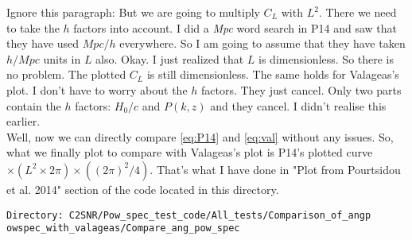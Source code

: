 \documentclass[12pt,a4paper]{article}
\begin{document}
Ignore this paragraph:  But we are going to multiply $ C_L $ with $ L^2 $. There we need to take the $ h $ factors into account.	I did a \textit{Mpc} word search in P14 and saw that they have used $ Mpc/h $ everywhere. So I am going to assume that they have taken $ h/Mpc $ units in $ L $ also.  Okay. I just realized that $ L $ is dimensionless. So there is no problem. The plotted $ C_L $ is still dimensionless. The same holds for Valageas's plot. I don't have to worry about the $ h $ factors. They just cancel. Only two parts contain the $ h $  factors: $ H_0/c $ and $ P(k,z) $ and they cancel. I didn't realise this earlier. 
\\

Well, now we can directly compare \eqref{eq:P14} and \eqref{eq:val} without any issues. So, what we finally plot to compare with Valageas's plot is P14's plotted curve $ \times (L^2 \times 2\pi)  \times \left( (2\pi)^2/4 \right) $. That's what I have done in "Plot from Pourtsidou et al. 2014" section of the code located in this directory. 
\begin{verbatim}
Directory: C2SNR/Pow_spec_test_code/All_tests/Comparison_of_angp
owspec_with_valageas/Compare_ang_pow_spec
\end{verbatim}
\end{document}
